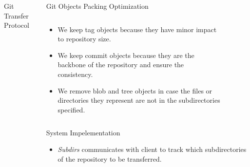 \documentclass[final]{beamer}
\begin{document}
\begin{frame}[t, fragile]
\begin{columns}[t]
\begin{column}{.5\linewidth}
\begin{block}{Git Transfer Protocol}
      \end{block}
    \end{column}
    \begin{column}{.5\linewidth}
      \begin{block}{Git Objects Packing Optimization}
        \begin{columns}[T]
          \begin{column}{.5\textwidth}
\begin{itemize}
    \justifying
  \item We keep tag objects because they have minor impact to repository size.

  \item We keep commit objects because they are the backbone of the repository
    and ensure the consistency.

  \item We remove blob and tree objects in case the files or directories they
    represent are not in the subdirectories specified.

\end{itemize}
          \end{column}
          \begin{column}{.5\textwidth}
              \begin{figure} \centering
              \end{figure}
              \begin{figure} \centering
              \end{figure}
              \begin{figure} \centering
              \end{figure}
          \end{column}
        \end{columns}
      \end{block}
      \begin{block}{System Impelementation}
            \begin{wrapfigure}{r}{.7\textwidth}
              \begin{minipage}{.7\textwidth}
              \begin{figure} \centering
              \end{figure}
            \end{minipage}
          \end{wrapfigure}
\begin{itemize}
    \justifying
  \item \emph{Subdirs} communicates with client to track which subdirectories
    of the repository to be transferred.


\end{itemize}
\end{block}
\end{column}
\end{columns}
\end{frame}
\end{document}
